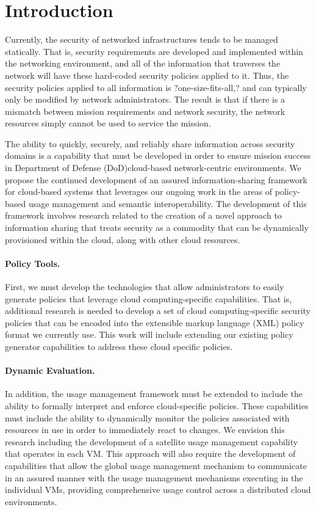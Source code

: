 \documentclass[10pt,letterpaper]{article}
\author{Christopher C. Lamb}
\begin{document}
\section{Introduction}
\label{sec:intro}
Currently, the security of networked infrastructures tends to be managed statically. That is, security requirements are developed and implemented within the networking environment, and all of the information that traverses the network will have these hard-coded security policies applied to it. Thus, the security policies applied to all information is ?one-size-fits-all,? and can typically only be modified by network administrators. The result is that if there is a mismatch between mission requirements and network security, the network resources simply cannot be used to service the mission.

The ability to quickly, securely, and reliably share information across security domains is a capability that must be developed in order to ensure mission success in Department of Defense (DoD)cloud-based network-centric environments. We propose the continued development of an assured information-sharing framework for cloud-based systems that leverages our ongoing work in the areas of policy-based usage management and semantic interoperability. The development of this framework involves research related to the creation of a novel approach to information sharing that treats security as a commodity that can be dynamically provisioned within the cloud, along with other cloud resources.

\paragraph{Policy Tools.} First, we must develop the technologies that allow administrators to easily generate policies that leverage cloud computing-specific capabilities. That is, additional research is needed to develop a set of cloud computing-specific security policies that can be encoded into the extensible markup language (XML) policy format we currently use. This work will include extending our existing policy generator capabilities to address these cloud specific policies.

\paragraph{Dynamic Evaluation.} In addition, the usage management framework must be extended to include the ability to formally interpret and enforce cloud-specific policies. These capabilities must include the ability to dynamically monitor the policies associated with resources in use in order to immediately react to changes. We envision this research including the development of a satellite usage management capability that operates in each VM. This approach will also require the development of capabilities that allow the global usage management mechanism to communicate in an assured manner with the usage management mechanisms executing in the individual VMs, providing comprehensive usage control across a distributed cloud environments.
\end{document}
